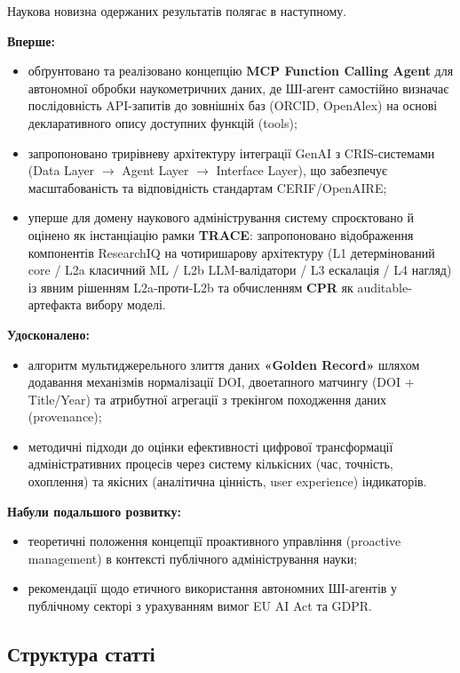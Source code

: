 Наукова новизна одержаних результатів полягає в наступному.

\textbf{Вперше:}
\begin{itemize}[leftmargin=*,itemsep=0.2em]
\item обґрунтовано та реалізовано концепцію \textbf{MCP Function Calling Agent} для автономної обробки наукометричних даних, де ШІ-агент самостійно визначає послідовність API-запитів до зовнішніх баз (ORCID, OpenAlex) на основі декларативного опису доступних функцій (tools);
\item запропоновано трирівневу архітектуру інтеграції GenAI з CRIS-системами (Data Layer $\to$ Agent Layer $\to$ Interface Layer), що забезпечує масштабованість та відповідність стандартам CERIF/OpenAIRE;
\iftrace
\item уперше для домену наукового адміністрування систему спроєктовано й оцінено як інстанціацію рамки \textbf{TRACE}: запропоновано відображення компонентів ResearchIQ на чотиришарову архітектуру (L1 детермінований core / L2a класичний ML / L2b LLM-валідатори / L3 ескалація / L4 нагляд) із явним рішенням L2a-проти-L2b та обчисленням \textbf{CPR} як auditable-артефакта вибору моделі.
\fi
\end{itemize}

\textbf{Удосконалено:}
\begin{itemize}[leftmargin=*,itemsep=0.2em]
\item алгоритм мультиджерельного злиття даних \textbf{«Golden Record»} шляхом додавання механізмів нормалізації DOI, двоетапного матчингу (DOI + Title/Year) та атрибутної агрегації з трекінгом походження даних (provenance);
\item методичні підходи до оцінки ефективності цифрової трансформації адміністративних процесів через систему кількісних (час, точність, охоплення) та якісних (аналітична цінність, user experience) індикаторів.
\end{itemize}

\textbf{Набули подальшого розвитку:}
\begin{itemize}[leftmargin=*,itemsep=0.2em]
\item теоретичні положення концепції проактивного управління (proactive management) в контексті публічного адміністрування науки;
\item рекомендації щодо етичного використання автономних ШІ-агентів у публічному секторі з урахуванням вимог EU AI Act та GDPR.
\end{itemize}

\subsection*{Структура статті}

